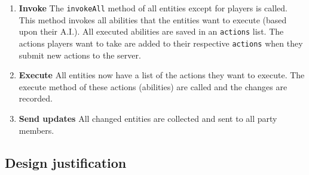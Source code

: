\documentclass[../main.tex]{subfiles}
\begin{document}
        \begin{enumerate}
            \item \textbf{Invoke} The \texttt{invokeAll} method of all entities except for players is called. This method invokes all abilities that the entities want to execute (based upon their A.I.). All executed abilities are saved in an \texttt{actions} list. The actions players want to take are added to their respective \texttt{actions} when they submit new actions to the server.
            \item \textbf{Execute} All entities now have a list of the actions they want to execute. The execute method of these actions (abilities) are called and the changes are recorded.
            \item \textbf{Send updates} All changed entities are collected and sent to all party members.
        \end{enumerate}
        
    \pagebreak 
	\subsection{Design justification}
\end{document}
